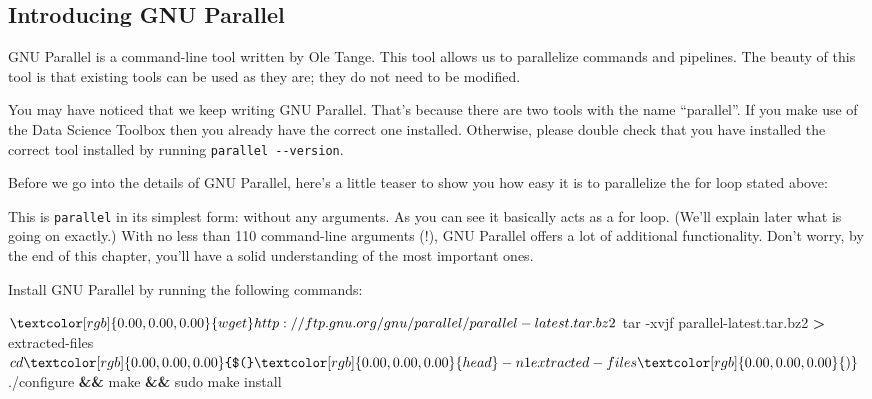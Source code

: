 \documentclass[
]{book}
\newenvironment{Shaded}{\begin{snugshade}}{\end{snugshade}}
\newcommand{\BuiltInTok}[1]{#1}
\newcommand{\ExtensionTok}[1]{#1}
\newcommand{\FunctionTok}[1]{\textcolor[rgb]{0.00,0.00,0.00}{#1}}
\newcommand{\KeywordTok}[1]{\textcolor[rgb]{0.13,0.29,0.53}{\textbf{#1}}}
\newcommand{\NormalTok}[1]{#1}
\newcommand{\OperatorTok}[1]{\textcolor[rgb]{0.81,0.36,0.00}{\textbf{#1}}}
\newcommand{\StringTok}[1]{\textcolor[rgb]{0.31,0.60,0.02}{#1}}
\newcommand{\VariableTok}[1]{\textcolor[rgb]{0.00,0.00,0.00}{#1}}
\theoremstyle{definition}
\theoremstyle{definition}
\theoremstyle{definition}
\theoremstyle{remark}
\begin{document}
\hypertarget{introducing-gnu-parallel}{%
\subsection{Introducing GNU Parallel}\label{introducing-gnu-parallel}}

GNU Parallel is a command-line tool written by Ole Tange. This tool allows us to parallelize commands and pipelines. The beauty of this tool is that existing tools can be used as they are; they do not need to be modified.

\begin{rmdcaution}
You may have noticed that we keep writing GNU Parallel. That's because there are two tools with the name ``parallel''. If you make use of the Data Science Toolbox then you already have the correct one installed. Otherwise, please double check that you have installed the correct tool installed by running \texttt{parallel\ -\/-version}.
\end{rmdcaution}

Before we go into the details of GNU Parallel, here's a little teaser to show you how easy it is to parallelize the for loop stated above:

\begin{Shaded}
\end{Shaded}

This is \texttt{parallel} in its simplest form: without any arguments. As you can see it basically acts as a for loop. (We'll explain later what is going on exactly.) With no less than 110 command-line arguments (!), GNU Parallel offers a lot of additional functionality. Don't worry, by the end of this chapter, you'll have a solid understanding of the most important ones.

Install GNU Parallel by running the following commands:

\begin{Shaded}
\begin{Highlighting}[]
\NormalTok{$ }\FunctionTok{wget}\NormalTok{ http://ftp.gnu.org/gnu/parallel/parallel-latest.tar.bz2}
\NormalTok{$ }\FunctionTok{tar}\NormalTok{ -xvjf parallel-latest.tar.bz2 }\OperatorTok{>}\NormalTok{ extracted-files}
\NormalTok{$ }\BuiltInTok{cd} \VariableTok{$(}\FunctionTok{head}\NormalTok{ -n 1 extracted-files}\VariableTok{)}
\NormalTok{$ }\ExtensionTok{./configure} \KeywordTok{&&} \FunctionTok{make} \KeywordTok{&&} \FunctionTok{sudo}\NormalTok{ make install}
\end{Highlighting}
\end{Shaded}
\end{document}
